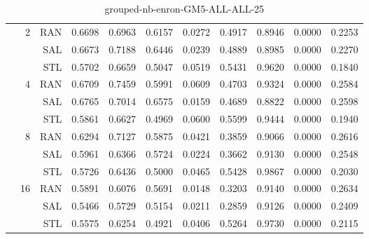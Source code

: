 \begin{center}
\begin{table}[htbp]
\begin{tabular}{ | r | r | r | r | r | r | r | r | r | r | r |}
 & \multirow{3}{*}{2} & RAN & 0.6698 & 0.6963 & 0.6157 & 0.0272 & 0.4917 & 0.8946 & 0.0000 & 0.2253\\ \cline{3-11}
 &   & SAL & 0.6673 & 0.7188 & 0.6446 & 0.0239 & 0.4889 & 0.8985 & 0.0000 & 0.2270\\ \cline{3-11}
 &   & STL & 0.5702 & 0.6659 & 0.5047 & 0.0519 & 0.5431 & 0.9620 & 0.0000 & 0.1840\\ \cline{2-11}
 & \multirow{3}{*}{4} & RAN & 0.6709 & 0.7459 & 0.5991 & 0.0609 & 0.4703 & 0.9324 & 0.0000 & 0.2584\\ \cline{3-11}
 &   & SAL & 0.6765 & 0.7014 & 0.6575 & 0.0159 & 0.4689 & 0.8822 & 0.0000 & 0.2598\\ \cline{3-11}
 &   & STL & 0.5861 & 0.6627 & 0.4969 & 0.0600 & 0.5599 & 0.9444 & 0.0000 & 0.1940\\ \cline{2-11}
 & \multirow{3}{*}{8} & RAN & 0.6294 & 0.7127 & 0.5875 & 0.0421 & 0.3859 & 0.9066 & 0.0000 & 0.2616\\ \cline{3-11}
 &   & SAL & 0.5961 & 0.6366 & 0.5724 & 0.0224 & 0.3662 & 0.9130 & 0.0000 & 0.2548\\ \cline{3-11}
 &   & STL & 0.5726 & 0.6436 & 0.5000 & 0.0465 & 0.5428 & 0.9867 & 0.0000 & 0.2030\\ \cline{2-11}
 & \multirow{3}{*}{16} & RAN & 0.5891 & 0.6076 & 0.5691 & 0.0148 & 0.3203 & 0.9140 & 0.0000 & 0.2634\\ \cline{3-11}
 &   & SAL & 0.5466 & 0.5729 & 0.5154 & 0.0211 & 0.2859 & 0.9126 & 0.0000 & 0.2409\\ \cline{3-11}
 &   & STL & 0.5575 & 0.6254 & 0.4921 & 0.0406 & 0.5264 & 0.9730 & 0.0000 & 0.2115\\ \cline{2-11}
\hline
\end{tabular}
\caption{grouped-nb-enron-GM5-ALL-ALL-25}
\end{table}
\end{center}

